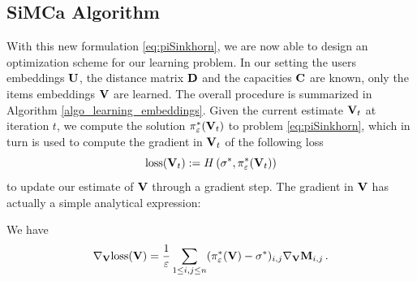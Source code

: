 \subsection*{SiMCa Algorithm}
With this new formulation \eqref{eq:piSinkhorn}, we are now able to design an
optimization scheme for our learning problem. In our setting the users
embeddings $\mathbf{U}$, the distance matrix $\mathbf{D}$ and the capacities $\mathbf{C}$ are known,
only the items embeddings $\mathbf{V}$ are learned. The overall procedure is summarized
in Algorithm \ref{algo_learning_embeddings}. Given the current estimate $\mathbf{V}_t$
at iteration $t$, we compute the solution $\pi^*_{\varepsilon}(\mathbf{V}_t)$ to problem
\eqref{eq:piSinkhorn}, which in turn is used to compute the gradient in $\mathbf{V}_t$
of the following loss
\begin{equation}\label{eq:loss_global}
    \mathrm{loss}(\mathbf{V}_t) := H\left(\sigma^*,\pi^*_{\varepsilon}(\mathbf{V}_t)\right)
\end{equation} to update our estimate of $\mathbf{V}$ through a gradient step. The gradient in $\mathbf{V}$
has actually a simple analytical expression:

\begin{lemma}\label{lemma:gradient} We have
    \begin{equation}
        \label{eq:gradient}
        \nabla_{\mathbf{V}} \mathrm{loss}(\mathbf{V}) = \frac{1}{\varepsilon} \sum_{1 \leq i,j \leq n} (\pi^*_\varepsilon(\mathbf{V}) - \sigma^*)_{i,j} \nabla_{\mathbf{V}} \mathbf{M}_{i,j} \, .
    \end{equation}
\end{lemma}

